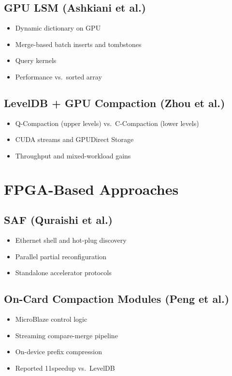\documentclass[sigconf]{acmart}
\begin{document}
  \subsection{GPU LSM (Ashkiani et al.)}
    \begin{itemize}
      \item Dynamic dictionary on GPU
      \item Merge-based batch inserts and tombstones
      \item Query kernels
      \item Performance vs.~sorted array
    \end{itemize}
  \subsection{LevelDB + GPU Compaction (Zhou et al.)}
    \begin{itemize}
      \item Q-Compaction (upper levels) vs.~C-Compaction (lower levels)
      \item CUDA streams and GPUDirect Storage
      \item Throughput and mixed-workload gains
    \end{itemize}

\section{FPGA-Based Approaches}
  \subsection{SAF (Quraishi et al.)}
    \begin{itemize}
      \item Ethernet shell and hot-plug discovery
      \item Parallel partial reconfiguration
      \item Standalone accelerator protocols
    \end{itemize}
  \subsection{On-Card Compaction Modules (Peng et al.)}
    \begin{itemize}
      \item MicroBlaze control logic
      \item Streaming compare-merge pipeline
      \item On-device prefix compression
      \item Reported 11\texttimes speedup vs.~LevelDB
    \end{itemize}
\end{document}
